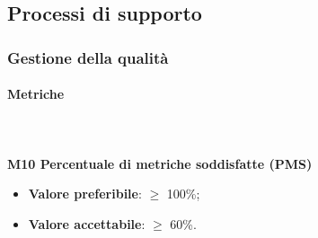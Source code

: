 	\subsection{Processi di supporto}		
		\subsubsection{Gestione della qualità}
			\paragraph{Metriche} \mbox{} \\ \\
				\textbf{M10 Percentuale di metriche soddisfatte (PMS)}
				\begin{itemize}
					\item \textbf{Valore preferibile}: $\ge$ 100\%;
					\item \textbf{Valore accettabile}: $\ge$ 60\%.
				\end{itemize}


		  
			
				

